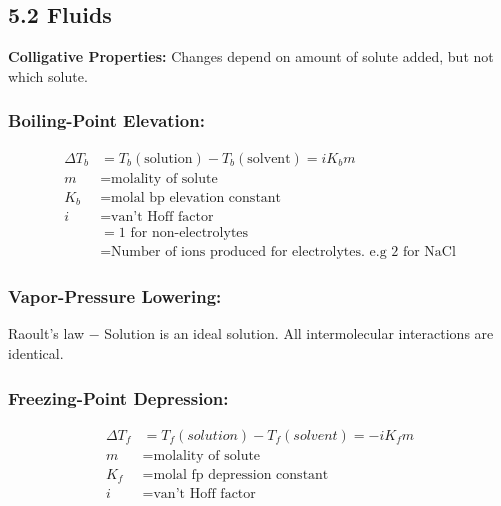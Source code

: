 \subsection{5.2 Fluids}
    \textbf{Colligative Properties: }Changes depend on amount of solute added, but not which solute.
    
    \subsubsection{Boiling-Point Elevation: }
        \begin{align*}
            \Delta T_b & = T_b (\textrm{solution}) - T_b (\textrm{solvent}) = iK_b m\\
            m & = \text{molality of solute}\\
            K_b & = \text{molal bp elevation constant}\\
            i & = \text{van't Hoff factor}\\
            & = 1 \text{ for non-electrolytes}\\
            & = \text{Number of ions produced for electrolytes.\ e.g 2 for NaCl}
        \end{align*}
    
    \subsubsection{Vapor-Pressure Lowering: }
    
        Raoult's law $-$ Solution is an ideal solution. All intermolecular interactions are identical. 
        \vspace*{0.5em}

    \subsubsection{Freezing-Point Depression: }
        \begin{align*}
            \Delta T_f & = T_f (solution) - T_f (solvent) = -iK_fm\\
            m & = \text{molality of solute}\\
            K_f & = \text{molal fp depression constant}\\
            i & = \text{van't Hoff factor}
        \end{align*}